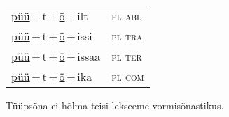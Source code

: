 \begin{minipage}{\textwidth}
\begin{sideways}
\begin{tabular}{l l}
\underline{püü}\,+\,t\,+\,\underline{ö}\,+\,ilt & \textsc{ pl abl } \\
\underline{püü}\,+\,t\,+\,\underline{ö}\,+\,issi & \textsc{ pl tra } \\
\underline{püü}\,+\,t\,+\,\underline{ö}\,+\,issaa & \textsc{ pl ter } \\
\underline{püü}\,+\,t\,+\,\underline{ö}\,+\,ika & \textsc{ pl com } \\
\end{tabular}
\end{sideways}
\label{tab:tüüpsõnamall-püütö}

\end{minipage}

 
\vspace{1em}
\noindent Tüüpsõna ei hõlma teisi lekseeme vormi\-sõnastikus.
